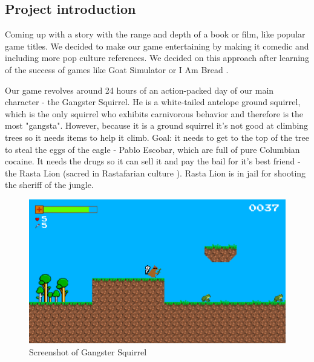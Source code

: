 \documentclass[12p]{article}
\begin{document}
\subsection{Project introduction} \label{ProjectIntroduction}

Coming up with a story with the range and depth of a book or film, like popular game titles. We decided to make our game entertaining by making it comedic and including more pop culture references. We decided on this approach after learning of the success of games like Goat Simulator \cite{GoatSimulator} or I Am Bread \cite{IAmBread}.

Our game revolves around 24 hours of an action-packed day of our main character - the Gangster Squirrel. He is a white-tailed antelope ground squirrel, which is the only squirrel who exhibits carnivorous behavior \cite{CarnivorousSquirells} and therefore is the most "gangsta". However, because it is a ground squirrel it’s not good at climbing trees so it needs items to help it climb.
Goal: it needs to get to the top of the tree to steal the eggs of the eagle - Pablo Escobar, which are full of pure Columbian cocaine. It needs the drugs so it can sell it and pay the bail for it’s best friend - the Rasta Lion (sacred in Rastafarian culture \cite{RastaLion}). Rasta Lion is in jail for shooting the sheriff \cite{Sheriff} of the jungle.

\begin{figure}[ht]
  \center
  \includegraphics[width=1\textwidth]{gameplayScreenshot.png}
  \caption{Screenshot of Gangster Squirrel}
\end{figure}

\end{document}
